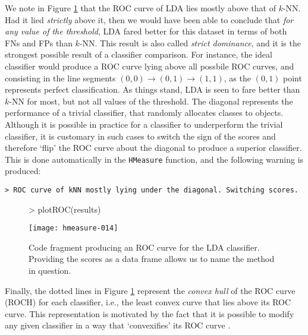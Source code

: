 \documentclass{article}
\begin{document}
We note in Figure \ref{fig:ROC} that the ROC curve of LDA lies mostly above that of $k$-NN. Had it lied \emph{strictly} above it, then we would have been able to conclude that \emph{for any value of the threshold}, LDA fared better for this dataset in terms of both FNs and FPs than $k$-NN. This result is also called \emph{strict dominance}, and it is the strongest possible result of a classifier comparison. For instance, the ideal classifier would produce a ROC curve lying above all possbile ROC curves, and consisting in the line segments $(0,0)\rightarrow (0,1) \rightarrow (1,1)$, as the $(0,1)$ point represents perfect classification. As things stand, LDA is seen to fare better than $k$-NN for most, but not all values of the threshold. The diagonal represents the performance of a trivial classifier, that randomly allocates classes to objects. Although it is possible in practice for a classifier to underperform the trivial classifier, it is customary in such cases to switch the sign of the scores and therefore `flip' the ROC curve about the diagonal to produce a superior classifier. This is done automatically in the \verb+HMeasure+ function, and the following warning is produced: 
\begin{verbatim}
> ROC curve of kNN mostly lying under the diagonal. Switching scores.
\end{verbatim}
\begin{figure}
\centering
\begin{Schunk}
\begin{Sinput}
> plotROC(results)
\end{Sinput}
\end{Schunk}
\texttt{[image: hmeasure-014]}
\caption{\label{fig:ROC}Code fragment producing an ROC curve for the LDA classifier. Providing the scores as a data frame allows us to name the method in question.}
\end{figure}

Finally, the dotted lines in Figure \ref{fig:ROC} represent the \emph{convex hull} of the  ROC curve (ROCH) for each classifier, i.e., the least convex curve that lies above its ROC curve. This representation is motivated by the fact that it is possible to modify any given classifier in a way that `convexifies' its ROC curve \cite{provost1998}.
\end{document}
